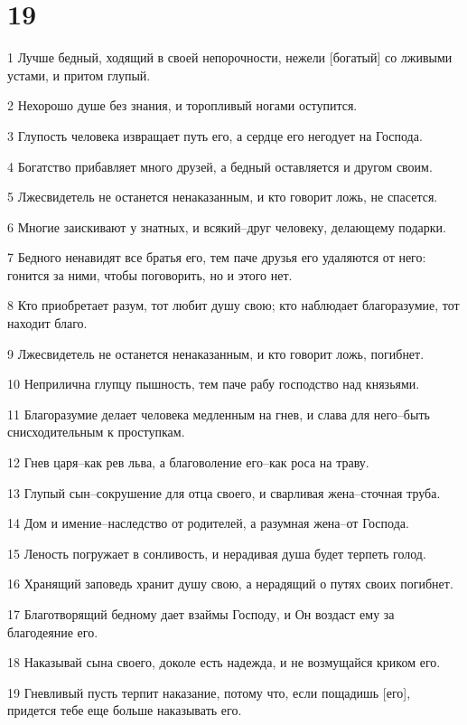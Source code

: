 \chapter{19}

\par 1 Лучше бедный, ходящий в своей непорочности, нежели [богатый] со лживыми устами, и притом глупый.
\par 2 Нехорошо душе без знания, и торопливый ногами оступится.
\par 3 Глупость человека извращает путь его, а сердце его негодует на Господа.
\par 4 Богатство прибавляет много друзей, а бедный оставляется и другом своим.
\par 5 Лжесвидетель не останется ненаказанным, и кто говорит ложь, не спасется.
\par 6 Многие заискивают у знатных, и всякий--друг человеку, делающему подарки.
\par 7 Бедного ненавидят все братья его, тем паче друзья его удаляются от него: гонится за ними, чтобы поговорить, но и этого нет.
\par 8 Кто приобретает разум, тот любит душу свою; кто наблюдает благоразумие, тот находит благо.
\par 9 Лжесвидетель не останется ненаказанным, и кто говорит ложь, погибнет.
\par 10 Неприлична глупцу пышность, тем паче рабу господство над князьями.
\par 11 Благоразумие делает человека медленным на гнев, и слава для него--быть снисходительным к проступкам.
\par 12 Гнев царя--как рев льва, а благоволение его--как роса на траву.
\par 13 Глупый сын--сокрушение для отца своего, и сварливая жена--сточная труба.
\par 14 Дом и имение--наследство от родителей, а разумная жена--от Господа.
\par 15 Леность погружает в сонливость, и нерадивая душа будет терпеть голод.
\par 16 Хранящий заповедь хранит душу свою, а нерадящий о путях своих погибнет.
\par 17 Благотворящий бедному дает взаймы Господу, и Он воздаст ему за благодеяние его.
\par 18 Наказывай сына своего, доколе есть надежда, и не возмущайся криком его.
\par 19 Гневливый пусть терпит наказание, потому что, если пощадишь [его], придется тебе еще больше наказывать его.
